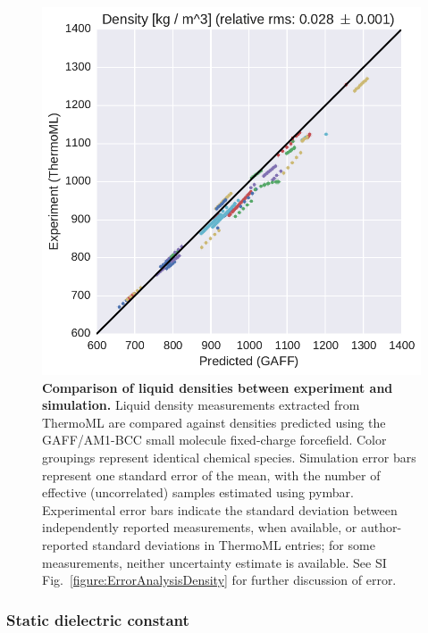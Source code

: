 \documentclass[aps,pre,twocolumn,nofootinbib,superscriptaddress,linenumbers]{revtex4-1}
\begin{document}
\begin{figure}
\includegraphics[width=\columnwidth]{./figures/densities_thermoml.pdf}
\caption{{\bf Comparison of liquid densities between experiment and simulation.}
Liquid density measurements extracted from ThermoML are compared against densities predicted using the GAFF/AM1-BCC small molecule fixed-charge forcefield.
Color groupings represent identical chemical species.  
Simulation error bars represent one standard error of the mean, with the number of effective (uncorrelated) samples estimated using pymbar.  
Experimental error bars indicate the standard deviation between independently reported measurements, when available, or author-reported standard deviations in ThermoML entries; for some measurements, neither uncertainty estimate is available.  
See SI Fig.~\ref{figure:ErrorAnalysisDensity} for further discussion of error.
}
\label{figure:Density}
\end{figure}


\subsubsection{Static dielectric constant}
\end{document}
